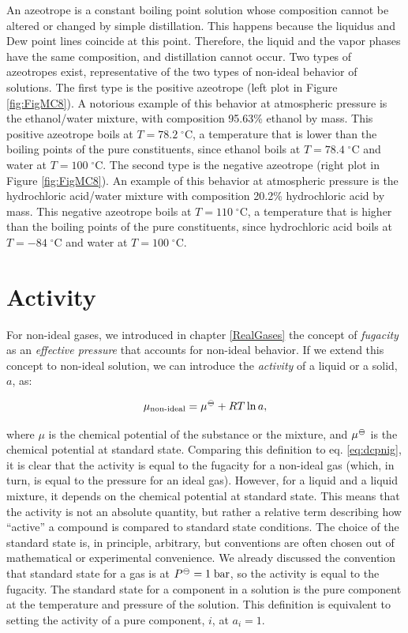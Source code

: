 \documentclass[
  9pt,
]{extbook}
\theoremstyle{definition}
\theoremstyle{definition}
\theoremstyle{definition}
\theoremstyle{remark}
\begin{document}
An azeotrope is a constant boiling point solution whose composition cannot be altered or changed by simple distillation. This happens because the liquidus and Dew point lines coincide at this point. Therefore, the liquid and the vapor phases have the same composition, and distillation cannot occur. Two types of azeotropes exist, representative of the two types of non-ideal behavior of solutions. The first type is the positive azeotrope (left plot in Figure \ref{fig:FigMC8}). A notorious example of this behavior at atmospheric pressure is the ethanol/water mixture, with composition 95.63\% ethanol by mass. This positive azeotrope boils at \(T=78.2\;^\circ \text{C}\), a temperature that is lower than the boiling points of the pure constituents, since ethanol boils at \(T=78.4\;^\circ \text{C}\) and water at \(T=100\;^\circ \text{C}\). The second type is the negative azeotrope (right plot in Figure \ref{fig:FigMC8}). An example of this behavior at atmospheric pressure is the hydrochloric acid/water mixture with composition 20.2\% hydrochloric acid by mass. This negative azeotrope boils at \(T=110\;^\circ \text{C}\), a temperature that is higher than the boiling points of the pure constituents, since hydrochloric acid boils at \(T=-84\;^\circ \text{C}\) and water at \(T=100\;^\circ \text{C}\).

\hypertarget{activity}{%
\section{Activity}\label{activity}}

For non-ideal gases, we introduced in chapter \ref{RealGases} the concept of \emph{fugacity} as an \emph{effective pressure} that accounts for non-ideal behavior. If we extend this concept to non-ideal solution, we can introduce the \emph{activity} of a liquid or a solid, \(a\), as:

\begin{equation}
\mu_{\text{non-ideal}} = \mu^{{-\kern-6pt{\ominus}\kern-6pt-}} + RT \ln a,
\label{eq:act1}
\end{equation}

where \(\mu\) is the chemical potential of the substance or the mixture, and \(\mu^{{-\kern-6pt{\ominus}\kern-6pt-}}\) is the chemical potential at standard state. Comparing this definition to eq. \eqref{eq:dcpnig}, it is clear that the activity is equal to the fugacity for a non-ideal gas (which, in turn, is equal to the pressure for an ideal gas). However, for a liquid and a liquid mixture, it depends on the chemical potential at standard state. This means that the activity is not an absolute quantity, but rather a relative term describing how ``active'' a compound is compared to standard state conditions. The choice of the standard state is, in principle, arbitrary, but conventions are often chosen out of mathematical or experimental convenience. We already discussed the convention that standard state for a gas is at \(P^{{-\kern-6pt{\ominus}\kern-6pt-}}=1\;\text{bar}\), so the activity is equal to the fugacity. The standard state for a component in a solution is the pure component at the temperature and pressure of the solution. This definition is equivalent to setting the activity of a pure component, \(i\), at \(a_i=1\).
\end{document}
